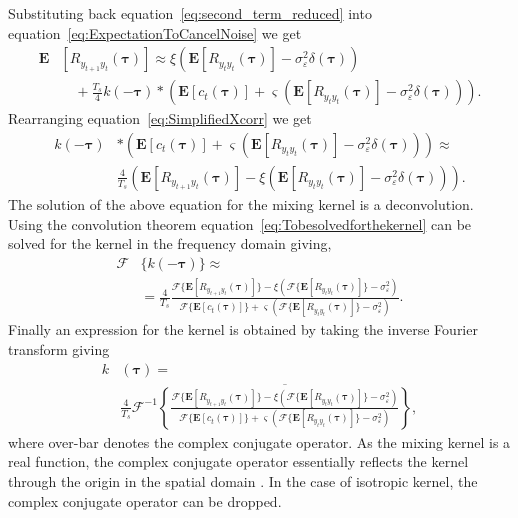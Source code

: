 \documentclass[10pt,twocolumn,twoside]{IEEEtran}
\begin{document}
Substituting back equation~\eqref{eq:second_term_reduced} into equation~\eqref{eq:ExpectationToCancelNoise} we get
\begin{align}\label{eq:SimplifiedXcorr}
	\mathbf{E}&[R_{y_{t+1}y_t}(\boldsymbol{\tau})] \approx \xi\left(\mathbf{E}[ R_{y_ty_t}(\boldsymbol{\tau})] - \sigma_{\varepsilon}^2 \delta(\boldsymbol{\tau})\right) \nonumber \\
	&\quad+ \frac{T_s}{4} k(-\boldsymbol\tau) \ast (\mathbf{E}\left[c_t(\boldsymbol\tau)\right] + \varsigma (\mathbf{E}\left[R_{y_ty_t}(\boldsymbol\tau)\right] - \sigma_{\varepsilon}^2 \delta(\boldsymbol\tau))).
\end{align}
Rearranging equation~\eqref{eq:SimplifiedXcorr} we get
\begin{align} \label{eq:Tobesolvedforthekernel}
	k(-\boldsymbol\tau) & \ast (\mathbf{E}\left[c_t(\boldsymbol\tau)\right] + \varsigma (\mathbf{E}\left[R_{y_ty_t}(\boldsymbol\tau)\right] - \sigma_{\varepsilon}^2 \delta(\boldsymbol\tau))) \approx  \nonumber \\
	& \frac{4}{T_s}(\mathbf{E}[R_{y_{t+1}y_t}(\boldsymbol{\tau})] - \xi\left(\mathbf{E}[ R_{y_ty_t}(\boldsymbol{\tau})] - \sigma_{\varepsilon}^2 \delta(\boldsymbol{\tau})\right)).
\end{align}
The solution of the above equation for the mixing kernel is a deconvolution. Using the convolution theorem equation~\eqref{eq:Tobesolvedforthekernel} can be solved for the kernel in the frequency domain giving,
\begin{align}
	\mathcal{F}&\{k(-\boldsymbol\tau)\} \approx  \nonumber \\
	&= \frac{4}{T_s} \frac{\mathcal{F}\{\mathbf{E}[R_{y_{t+1}y_t}(\boldsymbol{\tau})]\} - \xi\left(\mathcal{F}\{\mathbf{E}[ R_{y_ty_t}(\boldsymbol{\tau})]\} - \sigma_{\varepsilon}^2 \right)} {\mathcal{F}\{\mathbf{E}\left[c_t(\boldsymbol\tau)\right]\} + \varsigma (\mathcal{F}\{\mathbf{E}\left[R_{y_ty_t}(\boldsymbol\tau)\right]\} - \sigma_{\varepsilon}^2 )}.  \label{eq:Fourier_TF_of_Kernel}
\end{align} 
Finally an expression for the kernel is obtained by taking the inverse Fourier transform giving 
\begin{align}\label{eq:EM-Fourier_TF_of_Kernel}   
	k&(\boldsymbol\tau) = \nonumber \\
	&\frac{4}{T_s}\mathcal{F}^{-1}\overline{\left\{ \frac{\mathcal{F}\{\mathbf{E}[R_{y_{t+1}y_t}(\boldsymbol{\tau})]\} - \xi\left(\mathcal{F}\{\mathbf{E}[ R_{y_ty_t}(\boldsymbol{\tau})]\} - \sigma_{\varepsilon}^2 \right)}{\mathcal{F}\{\mathbf{E}\left[c_t(\boldsymbol\tau)\right]\} + \varsigma (\mathcal{F}\{\mathbf{E}\left[R_{y_ty_t}(\boldsymbol\tau)\right]\} - \sigma_{\varepsilon}^2 )} \right\}},
\end{align}
 where over-bar denotes the complex conjugate operator. As the mixing kernel is a real function, the complex conjugate operator essentially reflects the kernel through the origin in the spatial domain \cite{Bracewell2000}. In the case of isotropic kernel, the complex conjugate operator can be dropped. 
\end{document}
